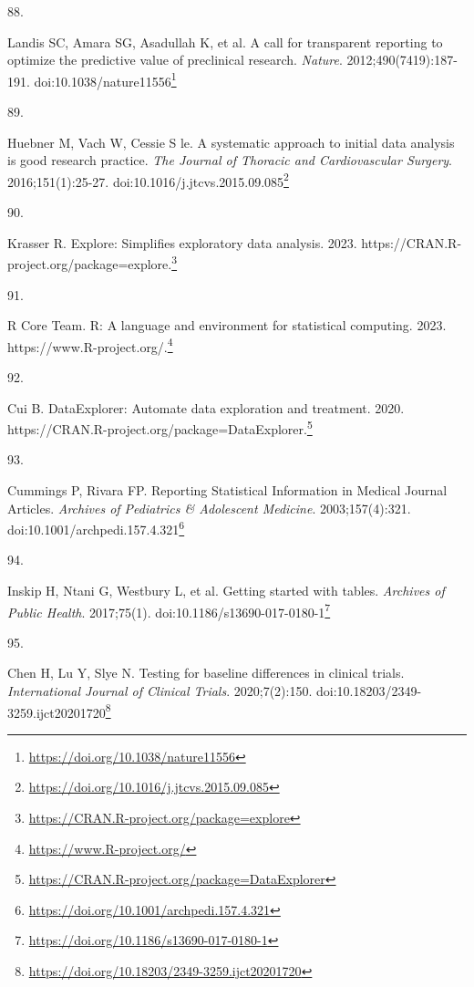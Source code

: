 \documentclass[
  a4paper,
]{book}
\newlength{\cslhangindent}
\newlength{\csllabelwidth}
\newlength{\cslentryspacingunit} %
\newenvironment{CSLReferences}[2] %
 {%
  \setlength{\parindent}{0pt}
  \ifodd #1
  \let\oldpar\par
  \def\par{\hangindent=\cslhangindent\oldpar}
  \fi
  \setlength{\parskip}{#2\cslentryspacingunit}
 }%
 {}
\newcommand{\CSLLeftMargin}[1]{\parbox[t]{\csllabelwidth}{#1}}
\newcommand{\CSLRightInline}[1]{\parbox[t]{\linewidth - \csllabelwidth}{#1}\break}
\renewcommand{\href}[2]{#2\footnote{\url{#1}}}
\begin{document}
\begin{CSLReferences}{0}{0}
\leavevmode{}%
\CSLLeftMargin{88. }%
\CSLRightInline{Landis SC, Amara SG, Asadullah K, et al. A call for transparent reporting to optimize the predictive value of preclinical research. \emph{Nature}. 2012;490(7419):187-191. doi:\href{https://doi.org/10.1038/nature11556}{10.1038/nature11556}}

\leavevmode{}%
\CSLLeftMargin{89. }%
\CSLRightInline{Huebner M, Vach W, Cessie S le. A systematic approach to initial data analysis is good research practice. \emph{The Journal of Thoracic and Cardiovascular Surgery}. 2016;151(1):25-27. doi:\href{https://doi.org/10.1016/j.jtcvs.2015.09.085}{10.1016/j.jtcvs.2015.09.085}}

\leavevmode{}%
\CSLLeftMargin{90. }%
\CSLRightInline{Krasser R. Explore: Simplifies exploratory data analysis. 2023. \href{https://CRAN.R-project.org/package=explore}{https://CRAN.R-project.org/package=explore.}}

\leavevmode{}%
\CSLLeftMargin{91. }%
\CSLRightInline{R Core Team. R: A language and environment for statistical computing. 2023. \href{https://www.R-project.org/}{https://www.R-project.org/.}}

\leavevmode{}%
\CSLLeftMargin{92. }%
\CSLRightInline{Cui B. DataExplorer: Automate data exploration and treatment. 2020. \href{https://CRAN.R-project.org/package=DataExplorer}{https://CRAN.R-project.org/package=DataExplorer.}}

\leavevmode{}%
\CSLLeftMargin{93. }%
\CSLRightInline{Cummings P, Rivara FP. Reporting Statistical Information in Medical Journal Articles. \emph{Archives of Pediatrics \& Adolescent Medicine}. 2003;157(4):321. doi:\href{https://doi.org/10.1001/archpedi.157.4.321}{10.1001/archpedi.157.4.321}}

\leavevmode{}%
\CSLLeftMargin{94. }%
\CSLRightInline{Inskip H, Ntani G, Westbury L, et al. Getting started with tables. \emph{Archives of Public Health}. 2017;75(1). doi:\href{https://doi.org/10.1186/s13690-017-0180-1}{10.1186/s13690-017-0180-1}}

\leavevmode{}%
\CSLLeftMargin{95. }%
\CSLRightInline{Chen H, Lu Y, Slye N. Testing for baseline differences in clinical trials. \emph{International Journal of Clinical Trials}. 2020;7(2):150. doi:\href{https://doi.org/10.18203/2349-3259.ijct20201720}{10.18203/2349-3259.ijct20201720}}


\end{CSLReferences}
\end{document}
